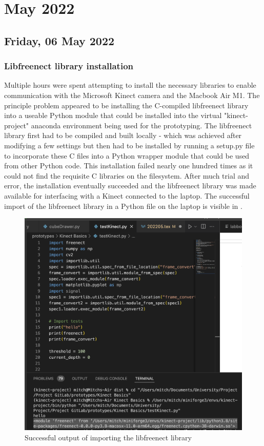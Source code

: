 \chapter[2022 May]{May 2022}

\section[2022/05/07]{Friday, 06 May 2022}

\subsection{Libfreenect library installation}

Multiple hours were spent attempting to install the necessary libraries to enable communication with the Microsoft Kinect camera and the Macbook Air M1. The principle problem appeared to be installing the C-compiled libfreenect library into a useable Python module that could be installed into the virtual "kinect-project" anaconda environment being used for the prototyping. The libfreenect library first had to be compiled and built locally - which was achieved after modifying a few settings but then had to be installed by running a setup.py file to incorporate these C files into a Python wrapper module that could be used from other Python code. This installation failed nearly one hundred times as it could not find the requisite C libraries on the filesystem. After much trial and error, the installation eventually succeeded and the libfreenect library was made available for interfacing with a Kinect connected to the laptop. The successful import of the libfreenect library in a Python file on the laptop is visible in .

\begin{figure}[h]
    \centering
    \includegraphics[width=0.5\linewidth]{figures/libfreenect_success.png}
    \caption{Successful output of importing the libfreenect library}
    \label{fig:libfreenect_success}
\end{figure}

